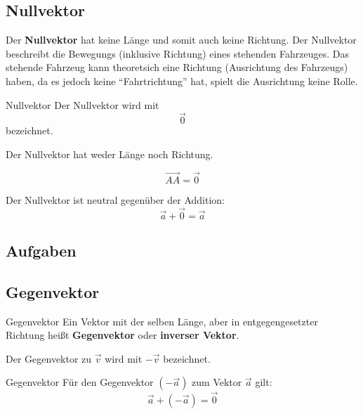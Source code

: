 \newpage

\subsection{Nullvektor}

Der \textbf{Nullvektor} hat keine Länge und somit auch keine
Richtung. Der Nullvektor beschreibt \zB die Bewegungs (inklusive
Richtung) eines stehenden Fahrzeuges.
Das stehende Fahrzeug kann theoretsich eine Richtung (Ausrichtung des
Fahrzeugs) haben, da es jedoch keine ``Fahrtrichtung'' hat, spielt die
Ausrichtung keine Rolle.

\begin{definition}{Nullvektor}{}
  Der Nullvektor wird mit
  $$\vec{0}$$
  bezeichnet.

  Der Nullvektor hat weder Länge noch Richtung.
\end{definition}

\begin{gesetz}{}{}
  $$\overrightarrow{AA} = \vec{0}$$
  \end{gesetz}

\begin{bemerkung}{}{}
  Der Nullvektor ist neutral gegenüber der Addition:
  $$\vec{a} + \vec{0}  = \vec{a}$$
\end{bemerkung}

\subsection*{Aufgaben}

\newpage


\subsection{Gegenvektor}

\begin{definition}{Gegenvektor}{}
  Ein Vektor mit der selben Länge, aber in entgegengesetzter Richtung
  heißt \textbf{Gegenvektor} oder \textbf{inverser Vektor}.

  Der Gegenvektor zu $\vec{v}$ wird mit $-\vec{v}$ bezeichnet.
\end{definition}

\begin{bemerkung}{Gegenvektor}{}
  Für den Gegenvektor $(-\vec{a})$ zum Vektor $\vec{a}$ gilt:
  $$\vec{a} + (-\vec{a}) = \vec{0}$$
  
\end{bemerkung}

